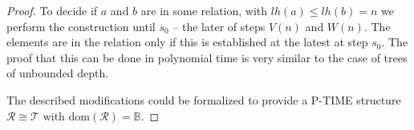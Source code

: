 \documentclass[a4paper,UKenglish,cleveref, autoref, thm-restate]{lipics-v2021}
\begin{document}
\begin{proof}
    To decide if $a$ and $b$ are in some relation, with $lh(a) \leq lh(b)=n$ we perform the construction until $s_0$ -- the later of steps $V(n)$ and $W(n)$. The elements are in the relation only if this is established at the latest at step $s_0$. The proof that this can be done in polynomial time is very similar to the case of trees of unbounded depth.

    The described modifications could be formalized to provide a P-TIME structure $\mathcal{R}\cong \mathcal{T}$ with $\mathrm{dom}(\mathcal{R}) = \mathbb{B}$. 
\end{proof}
    
\end{document}
